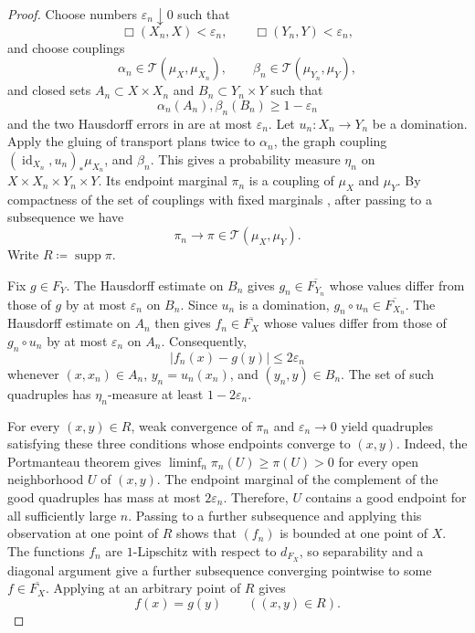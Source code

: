 \documentclass{amsart}
\theoremstyle{plain}
\theoremstyle{definition}
\theoremstyle{remark}
\DeclareMathOperator{\supp}{supp}
\newcommand{\Tplan}{\mathcal{T}}
\begin{document}
\begin{proof}
Choose numbers $\varepsilon_n\downarrow0$ such that
\[\Box(X_n,X)<\varepsilon_n,\qquad \Box(Y_n,Y)<\varepsilon_n,\]
and choose couplings
\[
\alpha_n\in\Tplan(\mu_X,\mu_{X_n}),\qquad
\beta_n\in\Tplan(\mu_{Y_n},\mu_Y),
\]
and closed sets $A_n\subset X\times X_n$ and $B_n\subset Y_n\times Y$ such that
\[\alpha_n(A_n),\beta_n(B_n)\geq1-\varepsilon_n\]
and the two Hausdorff errors in  are at most $\varepsilon_n$.
Let $u_n\colon X_n\to Y_n$ be a domination. Apply the gluing of transport plans twice
\cite[Definition~4.1]{shioya2024sgc} to $\alpha_n$, the graph coupling
$(\operatorname{id}_{X_n},u_n)_*\mu_{X_n}$, and $\beta_n$. This gives a probability measure
$\eta_n$ on $X\times X_n\times Y_n\times Y$. Its endpoint marginal $\pi_n$ is a coupling
of $\mu_X$ and $\mu_Y$. By compactness of the set of couplings with fixed marginals
\cite[Lemma~2.11]{gds1}, after passing to a subsequence we have
\[\pi_n\longrightarrow\pi\in\Tplan(\mu_X,\mu_Y).\]
Write $R\coloneqq\supp\pi$.

Fix $g\in F_Y$. The Hausdorff estimate on $B_n$ gives
$g_n\in\overline{F_{Y_n}}$ whose values differ from those of $g$ by at most
$\varepsilon_n$ on $B_n$. Since $u_n$ is a domination,
$g_n\circ u_n\in\overline{F_{X_n}}$. The Hausdorff estimate on $A_n$ then gives
$f_n\in\overline{F_X}$ whose values differ from those of $g_n\circ u_n$ by at most
$\varepsilon_n$ on $A_n$. Consequently,
\begin{equation}
\label{eq:exact-domination-glued-error}
|f_n(x)-g(y)|\leq2\varepsilon_n
\end{equation}
whenever $(x,x_n)\in A_n$, $y_n=u_n(x_n)$, and $(y_n,y)\in B_n$.
The set of such quadruples has $\eta_n$-measure at least $1-2\varepsilon_n$.

For every $(x,y)\in R$, weak convergence of $\pi_n$ and
$\varepsilon_n\to0$ yield quadruples satisfying these three conditions whose endpoints
converge to $(x,y)$. Indeed, the Portmanteau theorem
\cite[Lemma~1.13]{shioya2016mmg} gives
$\liminf_n\pi_n(U)\geq\pi(U)>0$ for every open neighborhood $U$ of $(x,y)$.
The endpoint marginal of the complement of the good quadruples has mass at most
$2\varepsilon_n$. Therefore, $U$ contains a good endpoint for all sufficiently large $n$.
Passing to a further subsequence and applying this observation
at one point of $R$ shows that $(f_n)$ is bounded at one point of $X$. The functions
$f_n$ are $1$-Lipschitz with respect to $d_{F_X}$, so separability and a diagonal
argument give a further subsequence converging pointwise to some
$f\in\overline{F_X}$. Applying  at an arbitrary
point of $R$ gives
\[f(x)=g(y)\qquad ((x,y)\in R).\]


\end{proof}
\end{document}
